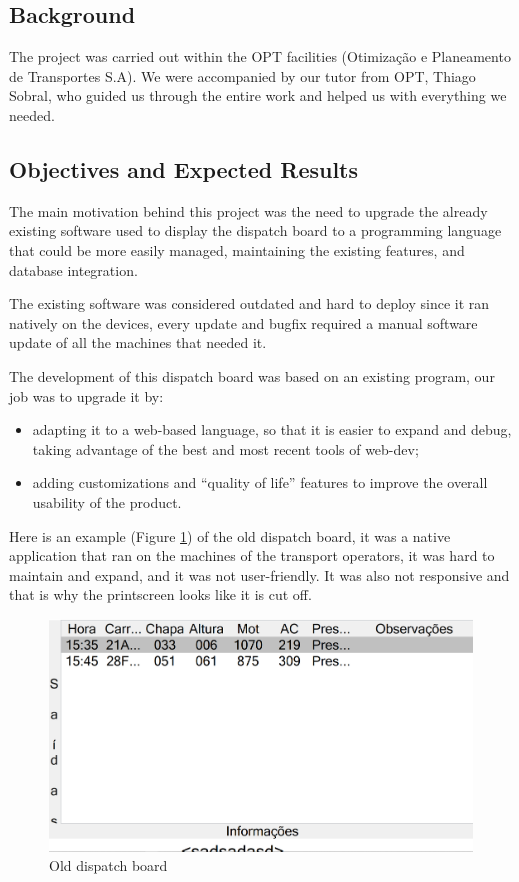 \documentclass[10pt]{article}
\begin{document}
    \subsection{Background}
    The project was carried out within the OPT facilities (Otimização e Planeamento de Transportes S.A). We were accompanied by our tutor from OPT, Thiago Sobral, who guided us through the entire work and helped us with everything we needed.

    \subsection{Objectives and Expected Results}
        The main motivation behind this project was the need to upgrade the already existing software used to display the dispatch board to a programming language that could be more easily managed, maintaining the existing features, and database integration.
        
        The existing software was considered outdated and hard to deploy since it ran natively on the devices, every update and bugfix required a manual software update of all the machines that needed it.

        The development of this dispatch board was based on an existing program, our job was to upgrade it by:
        \begin{itemize}
            \item adapting it to a web-based language, so that it is easier to expand and debug, taking advantage of the best and most recent tools of web-dev;
            \item adding customizations and “quality of life” features to improve the overall usability of the product.
        \end{itemize}

        Here is an example (Figure \ref{fig:old_dispatch_board}) of the old dispatch board, it was a native application that ran on the machines of the transport operators, it was hard to maintain and expand, and it was not user-friendly. It was also not responsive and that is why the printscreen looks like it is cut off.
        
        \vfill
        \begin{figure}[!ht]
            \centering
            \includegraphics[width=1\textwidth]{old_dispatch_board}
            \caption{Old dispatch board}
            \label{fig:old_dispatch_board}
        \end{figure}
        
\end{document}
